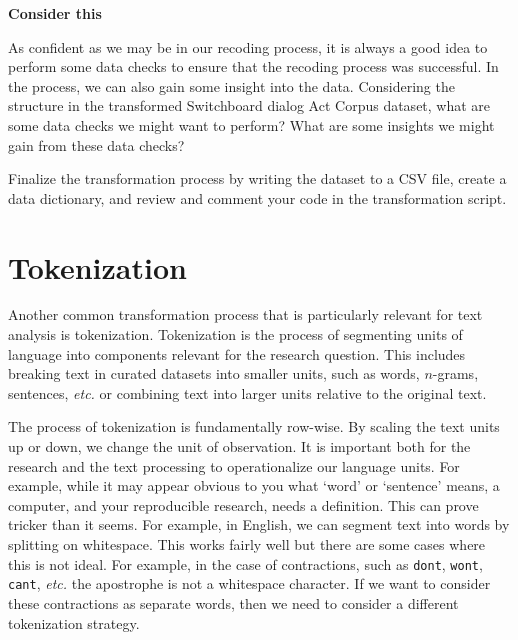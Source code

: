 \documentclass[
  letterpaper,
  DIV=11,
  numbers=noendperiod]{scrreport}
\theoremstyle{definition}
\theoremstyle{remark}
\begin{document}
\begin{tcolorbox}[enhanced jigsaw, leftrule=.75mm, bottomrule=.15mm, opacityback=0, breakable, left=2mm, colback=white, toprule=.15mm, arc=.35mm, rightrule=.15mm]

\textbf{ Consider this}

As confident as we may be in our recoding process, it is always a good
idea to perform some data checks to ensure that the recoding process was
successful. In the process, we can also gain some insight into the data.
Considering the structure in the transformed Switchboard dialog Act
Corpus dataset, what are some data checks we might want to perform? What
are some insights we might gain from these data checks?

\end{tcolorbox}

Finalize the transformation process by writing the dataset to a CSV
file, create a data dictionary, and review and comment your code in the
transformation script.

\hypertarget{sec-td-tokenization}{%
\section{Tokenization}\label{sec-td-tokenization}}

Another common transformation process that is particularly relevant for
text analysis is tokenization. Tokenization is the process of segmenting
units of language into components relevant for the research question.
This includes breaking text in curated datasets into smaller units, such
as words, \(n\)-grams, sentences, \emph{etc.} or combining text into
larger units relative to the original text.

The process of tokenization is fundamentally row-wise. By scaling the
text units up or down, we change the unit of observation. It is
important both for the research and the text processing to
operationalize our language units. For example, while it may appear
obvious to you what `word' or `sentence' means, a computer, and your
reproducible research, needs a definition. This can prove tricker than
it seems. For example, in English, we can segment text into words by
splitting on whitespace. This works fairly well but there are some cases
where this is not ideal. For example, in the case of contractions, such
as \texttt{don\textquotesingle{}t}, \texttt{won\textquotesingle{}t},
\texttt{can\textquotesingle{}t}, \emph{etc.} the apostrophe is not a
whitespace character. If we want to consider these contractions as
separate words, then we need to consider a different tokenization
strategy.
\end{document}
